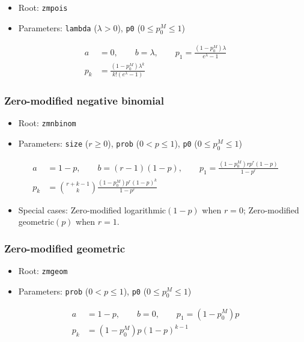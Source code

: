 \documentclass[x11names]{article}
\newcommand{\code}[1]{\texttt{#1}}
\begin{document}
\begin{itemize}
\item Root: \code{zmpois}
\item Parameters: \code{lambda} ($\lambda > 0$),
  \code{p0} ($0 \leq p_0^M \leq 1$)
\end{itemize}
\begin{align*}
  a &= 0, \qquad b = \lambda, \qquad
      p_1 = \frac{(1 - p_0^M) \lambda}{e^\lambda - 1} \\
  p_k &= \frac{(1 - p_0^M) \lambda^k}{k! (e^\lambda - 1)}
\end{align*}

\subsubsection{Zero-modified negative binomial}

\begin{itemize}
\item Root: \code{zmnbinom}
\item Parameters: \code{size} ($r \geq 0$),
  \code{prob} ($0 < p \leq 1$),
  \code{p0} ($0 \leq p_0^M \leq 1$)
\end{itemize}
\begin{align*}
  a &= 1 - p, \qquad b = (r - 1)(1 - p), \qquad
      p_1 = \frac{(1 - p_0^M) r p^r (1 - p)}{1 - p^r} \\
  p_k &= \binom{r+k-1}{k} \frac{(1 - p_0^M) p^r (1 - p)^k}{1 - p^r}
\end{align*}

\begin{itemize}
\item Special cases: Zero-modified logarithmic$(1 - p)$ when $r = 0$;
  Zero-modified geometric$(p)$ when $r = 1$.
\end{itemize}

\subsubsection{Zero-modified geometric}

\begin{itemize}
\item Root: \code{zmgeom}
\item Parameters: \code{prob} ($0 < p \leq 1$),
  \code{p0} ($0 \leq p_0^M \leq 1$)
\end{itemize}
\begin{align*}
  a &= 1 - p, \qquad b = 0, \qquad p_1 = (1 - p_0^M) p \\
  p_k &= (1 - p_0^M) p (1 - p)^{k - 1}
\end{align*}
\end{document}

